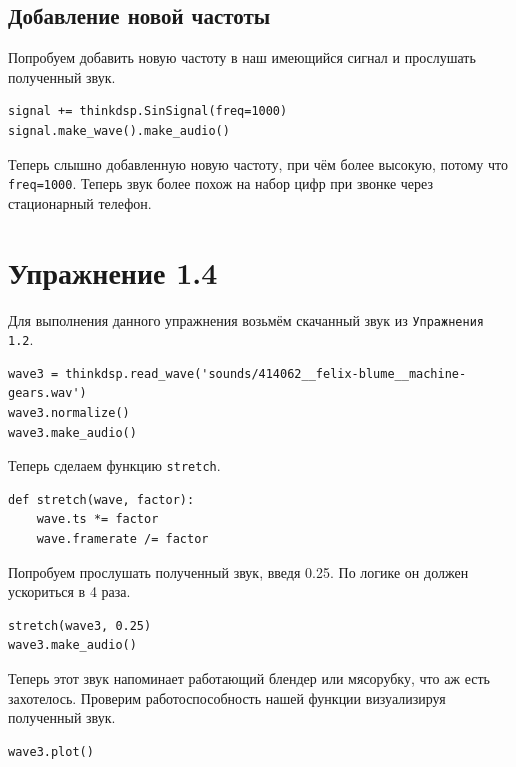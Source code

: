 \documentclass[a4paper,12pt]{report}
\begin{document}
\section{Добавление новой частоты}

Попробуем добавить новую частоту в наш имеющийся сигнал и прослушать полученный звук.

\begin{lstlisting}[caption=Добавление новой частоты и воспроизведение]
signal += thinkdsp.SinSignal(freq=1000)
signal.make_wave().make_audio()
\end{lstlisting}

Теперь слышно добавленную новую частоту, при чём более высокую, потому что \texttt{freq=1000}. Теперь звук более похож на набор цифр при звонке через стационарный телефон.

\chapter{Упражнение 1.4}

Для выполнения данного упражнения возьмём скачанный звук из \texttt{Упражнения 1.2}.

\begin{lstlisting}[caption=Загрузка и прослушивание звука]
wave3 = thinkdsp.read_wave('sounds/414062__felix-blume__machine-gears.wav')
wave3.normalize()
wave3.make_audio()
\end{lstlisting}

Теперь сделаем функцию \texttt{stretch}.

\begin{lstlisting}[caption=Функция stretch]
def stretch(wave, factor):
    wave.ts *= factor
    wave.framerate /= factor
\end{lstlisting}

Попробуем прослушать полученный звук, введя 0.25. По логике он должен ускориться в 4 раза.

\begin{lstlisting}[caption=Прослушивание ускоренного звука]
stretch(wave3, 0.25)
wave3.make_audio()
\end{lstlisting}

Теперь этот звук напоминает работающий блендер или мясорубку, что аж есть захотелось. Проверим работоспособность нашей функции визуализируя полученный звук.

\begin{lstlisting}[caption=Визуализация ускоренного звука]
wave3.plot()
\end{lstlisting}
\end{document}
